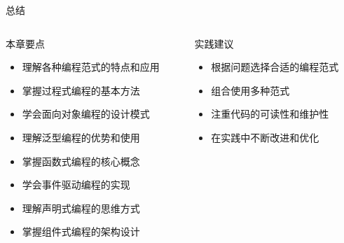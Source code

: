\documentclass[UTF8,aspectratio=169]{beamer}
\begin{document}
\begin{frame}{总结}
    \begin{columns}
        \begin{column}{0.48\textwidth}
            \begin{ytublock}{本章要点}
                \begin{itemize}
                    \item 理解各种编程范式的特点和应用
                    \item 掌握过程式编程的基本方法
                    \item 学会面向对象编程的设计模式
                    \item 理解泛型编程的优势和使用
                    \item 掌握函数式编程的核心概念
                    \item 学会事件驱动编程的实现
                    \item 理解声明式编程的思维方式
                    \item 掌握组件式编程的架构设计
                \end{itemize}
            \end{ytublock}
        \end{column}
        \begin{column}{0.48\textwidth}
            \begin{ytublock}{实践建议}
                \begin{itemize}
                    \item 根据问题选择合适的编程范式
                    \item 组合使用多种范式
                    \item 注重代码的可读性和维护性
                    \item 在实践中不断改进和优化
                \end{itemize}
            \end{ytublock}
        \end{column}
    \end{columns}
\end{frame}
\end{document}
